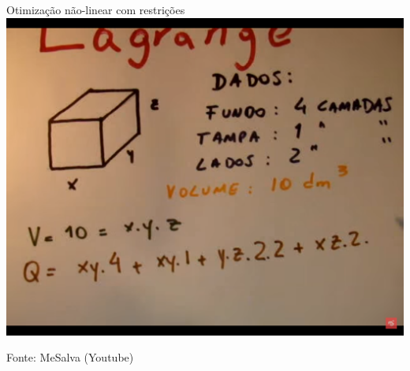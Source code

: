 \documentclass{beamer}
\begin{document}
\begin{frame}{Otimização não-linear com restrições}
  \centering
  \includegraphics[height=.8\textheight]{otimizacao/lagrange2}

\vfill
Fonte: MeSalva (Youtube)
\end{frame}
\end{document}
